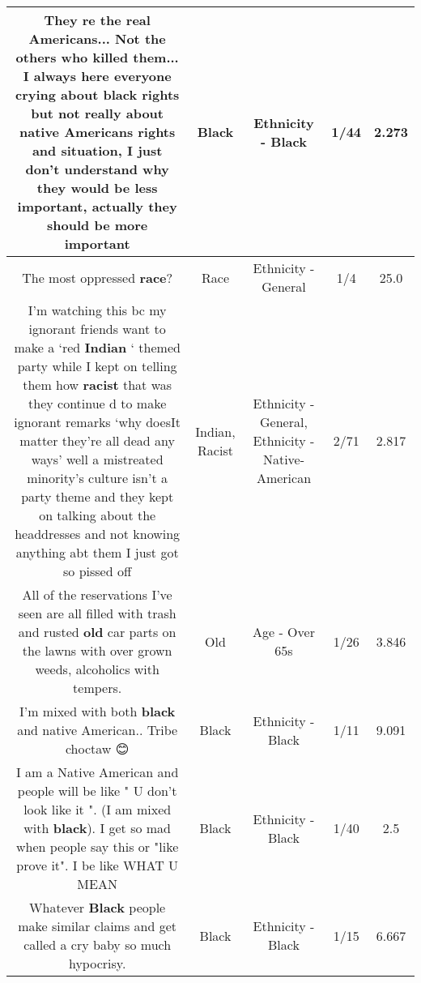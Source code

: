 \documentclass[11pt]{article}
\newlength\mylength
\begin{document}
\begin{center}
\begin{longtable}{|C{.65\mylength}|C{.30\mylength}|C{.12\mylength}|C{.12\mylength}|C{.12\mylength}|}
  \small They re the real Americans... Not the others who killed them... I always here everyone crying about \textbf{black} rights but not really about native Americans rights and situation, I just don't understand why they would be less important, actually they should be more important\normalsize   & Black & Ethnicity - Black & 1/44 & 2.273 \\  \hline
  \small The most oppressed \textbf{race}?\normalsize   & Race & Ethnicity - General & 1/4 & 25.0 \\  \hline
  \small I'm watching this bc my ignorant friends want to make a ‘red \textbf{Indian} ‘ themed party while I kept on telling them how \textbf{racist} that was they continue d to make ignorant remarks ‘why doesIt matter they're all dead any ways' well a mistreated minority's culture isn't a party theme and they kept on talking about the headdresses and not knowing anything abt them I just got so pissed off\normalsize   & Indian, Racist & Ethnicity - General, Ethnicity - Native-American & 2/71 & 2.817 \\  \hline
  \small All of the reservations I've seen are all filled with trash and rusted \textbf{old} car parts on the lawns with over grown weeds, alcoholics with tempers.\normalsize   & Old & Age - Over 65s & 1/26 & 3.846 \\  \hline
  \small I'm mixed with both \textbf{black} and native American.. Tribe choctaw 😊\normalsize   & Black & Ethnicity - Black & 1/11 & 9.091 \\  \hline
  \small I am a Native American and people will be like " U don't look like it ". (I am mixed with \textbf{black}). I get so mad when people say this or "like prove it". I be like WHAT U MEAN\normalsize   & Black & Ethnicity - Black & 1/40 & 2.5 \\  \hline
  \small Whatever \textbf{Black} people make similar claims and get called a cry baby so much hypocrisy.\normalsize   & Black & Ethnicity - Black & 1/15 & 6.667 \\  \hline

\end{longtable}
\end{center}
\end{document}
